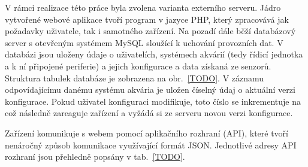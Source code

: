     V rámci realizace této práce byla zvolena varianta externího serveru. Jádro vytvořené webové aplikace tvoří program v jazyce PHP, který zpracovává jak požadavky uživatele, tak i samotného zařízení. Na pozadí dále běží databázový server s otevřeným systémem MySQL sloužící k uchování provozních dat. V databázi jsou uloženy údaje o uživatelích, systémech akvárií (tedy řídicí jednotka a k ní připojené periferie) a jejich konfigurace a data získaná ze senzorů. Struktura tabulek databáze je zobrazena na obr.~\ref{TODO}. V záznamu odpovídajícímu danému systému akvária je uložen číselný údaj o aktuální verzi konfigurace. Pokud uživatel konfiguraci modifikuje, toto číslo se inkrementuje na což následně zareaguje zařízení a vyžádá si ze serveru novou verzi konfigurace. 

    Zařízení komunikuje s webem pomocí aplikačního rozhraní (API), které tvoří nenáročný způsob komunikace využívající formát JSON. Jednotlivé adresy API rozhraní jsou přehledně popsány v tab.~\ref{TODO}. 

